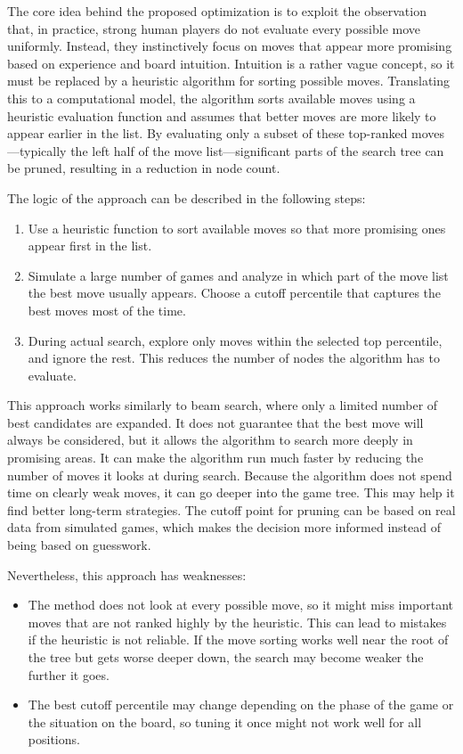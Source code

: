 The core idea behind the proposed optimization is to exploit the observation that, in practice, strong human players do not evaluate every possible move uniformly. Instead, they instinctively focus on moves that appear more promising based on experience and board intuition. Intuition is a rather vague concept, so it must be replaced by a heuristic algorithm for sorting possible moves. Translating this to a computational model, the algorithm sorts available moves using a heuristic evaluation function and assumes that better moves are more likely to appear earlier in the list. By evaluating only a subset of these top-ranked moves—typically the left half of the move list—significant parts of the search tree can be pruned, resulting in a reduction in node count.

\newpage
The logic of the approach can be described in the following steps:

\begin{enumerate}
    \item Use a heuristic function to sort available moves so that more promising ones appear first in the list.
    \item Simulate a large number of games and analyze in which part of the move list the best move usually appears. Choose a cutoff percentile that captures the best moves most of the time.
    \item During actual search, explore only moves within the selected top percentile, and ignore the rest. This reduces the number of nodes the algorithm has to evaluate.
\end{enumerate}

This approach works similarly to beam search, where only a limited number of best candidates are expanded. It does not guarantee that the best move will always be considered, but it allows the algorithm to search more deeply in promising areas.
It can make the algorithm run much faster by reducing the number of moves it looks at during search. Because the algorithm does not spend time on clearly weak moves, it can go deeper into the game tree. This may help it find better long-term strategies. The cutoff point for pruning can be based on real data from simulated games, which makes the decision more informed instead of being based on guesswork.

 Nevertheless, this approach has weaknesses:

 \begin{itemize}
     \item  The method does not look at every possible move, so it might miss important moves that are not ranked highly by the heuristic. This can lead to mistakes if the heuristic is not reliable. If the move sorting works well near the root of the tree but gets worse deeper down, the search may become weaker the further it goes.
     \item The best cutoff percentile may change depending on the phase of the game or the situation on the board, so tuning it once might not work well for all positions.
 \end{itemize}



